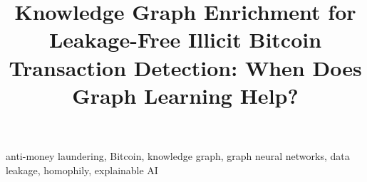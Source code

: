 \documentclass[conference]{IEEEtran}
\begin{document}
\title{Knowledge Graph Enrichment for Leakage-Free Illicit Bitcoin Transaction Detection: When Does Graph Learning Help?}

\author{
}

\maketitle



\begin{IEEEkeywords}
anti-money laundering, Bitcoin, knowledge graph, graph neural networks, data leakage, homophily, explainable AI
\end{IEEEkeywords}











\end{document}
